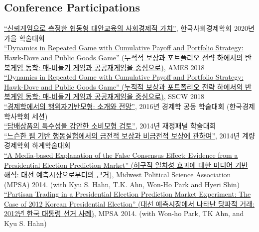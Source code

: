 \documentclass[11pt, a4paper]{article} %
\newcommand{\years}[1]{\marginnote{\scriptsize #1}} %
\begin{document}
\subsection*{Conference Participations}
\years{2020}
\href{https://www.dropbox.com/s/frw2wreosoyt7zd/coopedu_ksesa.pdf?dl=0}{``신뢰게임으로 측정한 협동형 대안교육의 사회경제적 가치''}, 한국사회경제학회 2020년 가을 학술대회\\
\years{2018}
\href{http://ames.sogang.ac.kr/dwonload/pdf/paper_399.pdf}{``Dynamics in Repeated Game with
Cumulative Payoff and Portfolio Strategy:
Hawk-Dove and Public Goods Game'' (누적적 보상과 포트폴리오 전략 하에서의 반복게임 동학: 매-비둘기 게임과 공공재게임을 중심으로)}, AMES 2018\\
\years{2018}
\href{https://editorialexpress.com/cgi-bin/conference/download.cgi?db_name=SCW2018&paper_id=269}{``Dynamics in Repeated Game with
Cumulative Payoff and Portfolio Strategy:
Hawk-Dove and Public Goods Game'' (누적적 보상과 포트폴리오 전략 하에서의 반복게임 동학: 매-비둘기 게임과 공공재게임을 중심으로)}, SSCW 2018\\
\years{2016} \href{http://spsm.snu.ac.kr/namun/papers/abm.pdf}{``경제학에서의 행위자기반모형: 소개와 전망''}, 2016년 경제학 공동 학술대회 (한국경제학사학회 세션)\\
\years{2014} \href{https://www.dropbox.com/s/5i99u86w7dkxgsb/tobacco_2014_KIPF_draft.pdf?dl=0}{``담배상품의 특수성을 감안한 소비모형 검토''}, 2014년 재정패널 학술대회\\
\years{2014} \href{https://www.dropbox.com/s/utbilo9ib0cwgiq/inv_2014s.pdf?dl=0}{``느슨한 웹 기반 행동실험에서의 금전적 보상과 비금전적 보상에 관하여''}, 2014년 계량경제학회 하계학술대회\\
\years{2014} \href{https://www.dropbox.com/s/gshcjhu31guh5mv/mpsa_false_consensus_media_effect.pdf?dl=0}{``A Media-based Explanation of the False Consensus Effect: Evidence from a Presidential Election Prediction Market'' (허구적 일치성 효과에 대한 미디어 기반 해석: 대선 예측시장으로부터의 근거)}, Midwest Political Science Association (MPSA) 2014. (with Kyu S. Hahn, T.K. Ahn, Won-Ho Park and Hyeri Shin)\\
\years{2014} \href{https://www.dropbox.com/s/qaq2p08mq5sn4tx/mpsa_partisan_trading_spsm_ver3.0.docx?dl=0}{``Partisan Trading in a Presidential Election Prediction Market Experiment: The Case of 2012 Korean Presidential Election'' (대선 예측시장에서 나타난 당파적 거래: 2012년 한국 대통령 선거 사례)}, MPSA 2014. (with Won-ho Park, TK Ahn, and Kyu S. Hahn)\\
\end{document}

